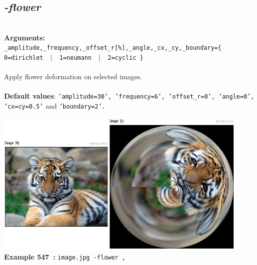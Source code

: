 \documentclass[a4paper,11pt,twoside]{book}
\begin{document}
\subsection{\emph{-flower} }\vspace*{-0.5em}
~\\\textbf{Arguments: } 
{\small \texttt{\_amplitude,\_frequency,\_offset\_r[\%],\_angle,\_cx,\_cy,\_boundary=\{ 0=dirichlet ~$|$~ 1=neumann ~$|$~ 2=cyclic \}}}\\~\\
Apply flower deformation on selected images.
~\\~\\\textbf{Default values}: {\small \texttt{'amplitude=30', 'frequency=6', 'offset\_r=0', 'angle=0', 'cx=cy=0.5'} and \texttt{'boundary=2'.}}
\begin{center}\includegraphics[keepaspectratio=true,height=7cm,width=\textwidth]{img/gmic_def547.jpg}\\
{\footnotesize \textbf{Example 547~:} \texttt{image.jpg -flower ,}}
\end{center}
\end{document}
